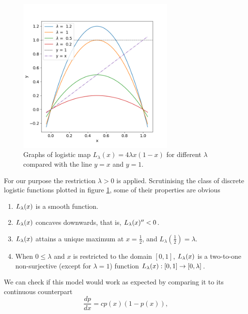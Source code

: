 \begin{figure}[t]
	\centering
	\includegraphics[width=0.7\textwidth]{./figures/logistic_map_diff_lambda.png}
	\caption{Graphs of logistic map $L_{\lambda}(x) = 4 \lambda x(1-x)$ for different $\lambda$ compared with the line $y=x$ and $y = 1$.} 
	\label{fig:logistic_map_diff_lambda}
\end{figure}

For our purpose the restriction $\lambda >0$ is applied.
Scrutinising the class of discrete logistic functions plotted in figure \ref{fig:logistic_map_diff_lambda}, some of their properties are obvious

\begin{enumerate}
	\item $L_{\lambda}(x)$ is a smooth function.
	\item $L_{\lambda}(x)$ concaves downwards, that is, $L_{\lambda}(x)'' < 0$.
	\item $L_{\lambda}(x)$ attains a unique maximum at $x = \frac{1}{2}$, and $L_{\lambda}(\frac{1}{2}) = \lambda$.
	\item When $0 \leq \lambda$ and $x$ is restricted to the domain $[0, 1]$, $L_{\lambda}(x)$ is a two-to-one non-surjective (except for $\lambda = 1$) function $L_{\lambda}(x): [0,1] \rightarrow [0,\lambda]$. 
\end{enumerate}


We can check if this model would work as expected by comparing it to its continuous counterpart 
\begin{equation}\label{eq_logistic_continuous}
	\frac{dp}{dx} = c p(x) (1-p(x)),
\end{equation}


